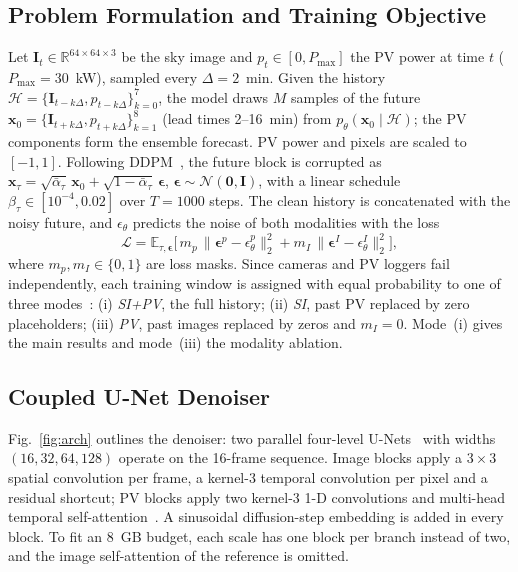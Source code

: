 \documentclass[conference]{IEEEtran}
\begin{document}
\subsection{Problem Formulation and Training Objective}
Let $\mathbf{I}_{t}\in\mathbb{R}^{64\times64\times3}$ be the sky image and $p_t\in[0,P_{\max}]$ the PV power at time
$t$ ($P_{\max}=30$~kW), sampled every $\Delta=2$~min. Given the history
$\mathcal{H}=\{\mathbf{I}_{t-k\Delta},p_{t-k\Delta}\}_{k=0}^{7}$, the model draws $M$ samples of the future
$\mathbf{x}_0=\{\mathbf{I}_{t+k\Delta},p_{t+k\Delta}\}_{k=1}^{8}$ (lead times 2--16~min) from
$p_\theta(\mathbf{x}_0\mid\mathcal{H})$; the PV components form the ensemble forecast. PV power and pixels are
scaled to $[-1,1]$. Following DDPM~\cite{ho2020ddpm}, the future block is corrupted as
$\mathbf{x}_\tau=\sqrt{\bar\alpha_\tau}\,\mathbf{x}_0+\sqrt{1-\bar\alpha_\tau}\,\boldsymbol{\epsilon}$,
$\boldsymbol{\epsilon}\sim\mathcal{N}(\mathbf{0},\mathbf{I})$, with a linear schedule $\beta_\tau\in[10^{-4},0.02]$ over
$T=1000$ steps. The clean history is concatenated with the noisy future, and $\epsilon_\theta$ predicts the noise of
both modalities with the loss
\begin{equation}
  \mathcal{L}=\mathbb{E}_{\tau,\boldsymbol\epsilon}\Big[\,m_{p}\,\big\|\boldsymbol\epsilon^{p}-\epsilon^{p}_\theta\big\|_2^2
  +m_{I}\,\big\|\boldsymbol\epsilon^{I}-\epsilon^{I}_\theta\big\|_2^2\Big],
  \label{eq:loss}
\end{equation}
where $m_p,m_I\in\{0,1\}$ are loss masks. Since cameras and PV loggers fail independently, each training window is
assigned with equal probability to one of three modes~\cite{huang2026pvmm}: (i) \emph{SI+PV}, the full history;
(ii) \emph{SI}, past PV replaced by zero placeholders; (iii) \emph{PV}, past images replaced by zeros and $m_I=0$.
Mode~(i) gives the main results and mode~(iii) the modality ablation.

\subsection{Coupled U-Net Denoiser}
Fig.~\ref{fig:arch} outlines the denoiser: two parallel four-level U-Nets~\cite{ronneberger2015unet} with widths
$(16,32,64,128)$ operate on the 16-frame sequence. Image blocks apply a $3\times3$ spatial convolution per frame, a
kernel-3 temporal convolution per pixel and a residual shortcut; PV blocks apply two kernel-3 1-D convolutions and
multi-head temporal self-attention~\cite{vaswani2017attention}. A sinusoidal diffusion-step embedding is added in every
block. To fit an 8~GB budget, each scale has one block per branch instead of two, and the image self-attention of
the reference is omitted.
\end{document}
